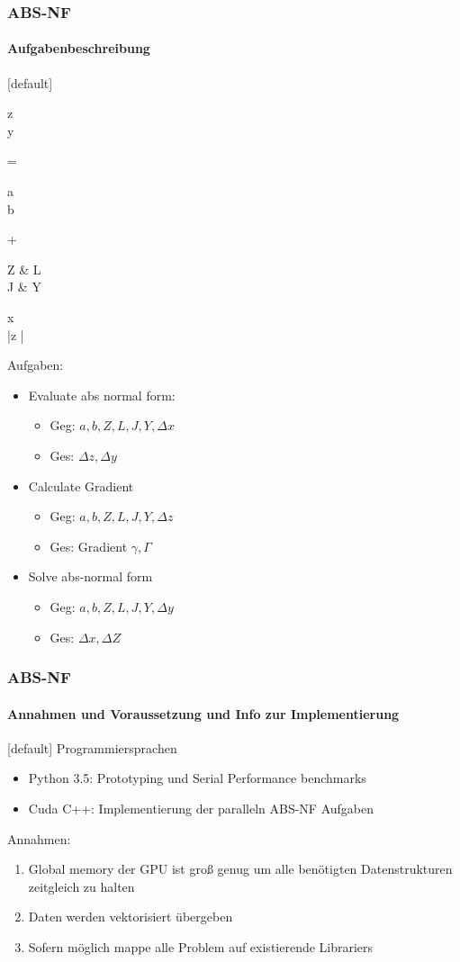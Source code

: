 \begin{frame}
	\frametitle{ABS-NF}
	\framesubtitle{Aufgabenbeschreibung}
	[default]
	\begin{flalign*}
	\begin{pmatrix}
	\Delta z \\
	\Delta y
	\end{pmatrix}
	= 
	\begin{pmatrix}
	a \\
	b
	\end{pmatrix}
	+
	\begin{pmatrix}
	Z & L \\
	J & Y 
	\end{pmatrix}
	\times
	\begin{pmatrix}
	\Delta x \\
	|\Delta z |
	\end{pmatrix}
	\end{flalign*}
	Aufgaben:
	\begin{itemize}
		\item <1-> Evaluate abs normal form:
			\begin{itemize}
				\item Geg: $a,b,Z,L,J,Y,\Delta x$
				\item Ges: $\Delta z, \Delta y$
			\end{itemize}
		\item <2-> Calculate Gradient
			\begin{itemize}
				\item Geg: $a,b,Z,L,J,Y, \Delta z$
				\item Ges: Gradient $\gamma, \Gamma$
			\end{itemize}
		\item <3-> Solve abs-normal form
		\begin{itemize}
			\item Geg: $a,b,Z,L,J,Y,\Delta y$
			\item Ges: $\Delta x, \Delta Z$
		\end{itemize}
	\end{itemize}
\end{frame}
\begin{frame}
	\frametitle{ABS-NF}
	\framesubtitle{Annahmen und Voraussetzung und Info zur Implementierung}
	[default]
	Programmiersprachen
	\begin{itemize}
		\item Python 3.5: Prototyping und Serial Performance benchmarks
		\item Cuda C++: Implementierung der paralleln ABS-NF Aufgaben
	\end{itemize}
	
	Annahmen:
	\begin{enumerate}
		\item Global memory der GPU ist groß genug um alle benötigten Datenstrukturen zeitgleich zu halten
		\item Daten werden vektorisiert übergeben
		\item Sofern möglich mappe alle Problem auf existierende Librariers
	\end{enumerate}
	
\end{frame}
